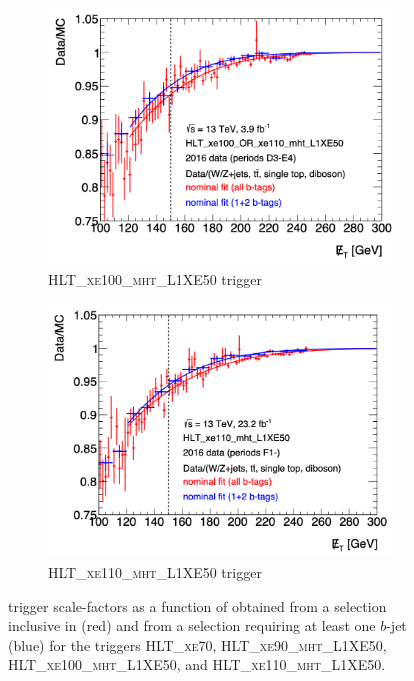 \begin{figure}[htbp]
\begin{subfigure}{0.49\textwidth}
    \centering
    \includegraphics[width=1.\textwidth]{figures/monoV/monoVtriggersf_HLTxe100.png}
    \caption{\textsc{HLT\_xe100\_mht\_L1XE50} \met trigger}
  \end{subfigure}
    \begin{subfigure}{0.49\textwidth}
    \centering
    \includegraphics[width=1.\textwidth]{figures/monoV/monoVtriggersf_HLTxe110.png}
    \caption{\textsc{HLT\_xe110\_mht\_L1XE50} \met trigger}
  \end{subfigure}
  \caption{\met trigger scale-factors as a function of \met obtained from a selection inclusive in \bjets (red) and from a selection requiring at least one \(b\)-jet (blue) for the \met triggers \textsc{HLT\_xe70}, \textsc{HLT\_xe90\_mht\_L1XE50}, \textsc{HLT\_xe100\_mht\_L1XE50}, and \textsc{HLT\_xe110\_mht\_L1XE50}.}
  \label{fig:appendix:monoV:trigger:mettriggerefficiency}
\end{figure}


